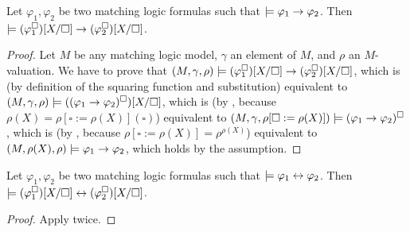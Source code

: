 \begin{lemma}\label{lem:implFOLtransl}
    Let $\varphi_1, \varphi_2$ be two matching logic formulas such that $\models \varphi_1 \rightarrow \varphi_2$.
    Then $\models (\varphi_1^\square)[X/\square] \rightarrow (\varphi_2^\square)[X/\square]$.
\end{lemma}
\begin{proof}
    Let $M$ be any matching logic model, $\gamma$ an element of $M$, and $\rho$ an $M$-valuation.
    We have to prove that $(M, \gamma, \rho) \models (\varphi_1^\square)[X/\square] \rightarrow (\varphi_2^\square)[X/\square]$,
    which is (by definition of the squaring function and substitution) equivalent to
    $(M, \gamma, \rho) \models ((\varphi_1 \rightarrow \varphi_2)^\square)[X/\square]$,
    which is
    (by , because $\rho(X) = \rho[\square := \rho(X)](\square)$)
    equivalent to
    $(M, \gamma, \rho[\square := \rho(X)]) \models (\varphi_1 \rightarrow \varphi_2)^\square$,
    which is  (by , because $\rho[\square := \rho(X)] = \rho^{\rho(X)}$) equivalent to
    $(M, \rho(X), \rho) \models \varphi_1 \rightarrow \varphi_2$,
    which holds by the assumption.
\end{proof}

\begin{lemma}\label{lem:equivFOLtransl}
    Let $\varphi_1, \varphi_2$ be two matching logic formulas such that $\models \varphi_1 \leftrightarrow \varphi_2$.
    Then $\models (\varphi_1^\square)[X/\square] \leftrightarrow (\varphi_2^\square)[X/\square]$.
\end{lemma}
\begin{proof}
    Apply  twice.
\end{proof}


